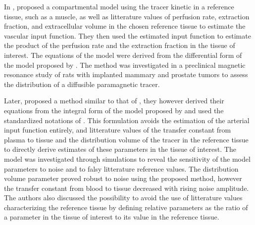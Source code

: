 In \citeyear{Kovar:1998bt}, \citet{Kovar:1998bt} proposed a compartmental model using the tracer kinetic in a reference tissue, such as a muscle, as well as litterature values of perfusion rate, extraction fraction, and extracellular volume in the chosen reference tissue to estimate the vascular input function.
They then used the estimated input function to estimate the product of the perfusion rate and the extraction fraction in the tissue of interest.
The equations of the model were derived from the differential form of the model proposed by \citet{Kety:1951tp}.
The method was investigated in a preclinical magnetic resonance study of rats with implanted mammary and prostate tumors to assess the distribution of a diffusible paramagnetic tracer.

Later, \citet{Yankeelov:2005dea} proposed a method similar to that of \citet{Kovar:1998bt}, they however derived their equations from the integral form of the model proposed by \citet{Kety:1951tp} and used the standardized notations of \citet{Tofts:1999ih}. 
This formulation avoids the estimation of the arterial input function entirely, and litterature values of the transfer constant from plasma to tissue and the distribution volume of the tracer in the reference tissue to directly derive estimates of these parameters in the tissue of interest.
The model was investigated through simulations to reveal the sensitivity of the model parameters to noise and to falsy litterature reference values.
The distribution volume parameter proved robust to noise using the proposed method, however the transfer constant from blood to tissue decreased with rising noise amplitude.
The authors also discussed the possibility to avoid the use of litterature values characterizing the reference tissue by defining relative parameters as the ratio of a parameter in the tissue of interest to its value in the reference tissue.

